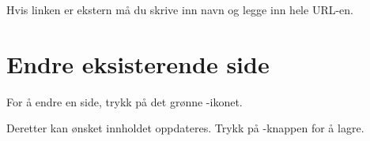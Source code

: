 Hvis linken er ekstern må du skrive inn navn og legge inn hele URL-en.
 \begin{figure}[H]
    \centering
    \label{fig:cms-external-link}
\end{figure}

\section{Endre eksisterende side}
For å endre en side, trykk på det grønne -ikonet. 

\begin{figure}[H]
    \centering
    \label{fig:cms-edit}
\end{figure}

Deretter kan ønsket innholdet oppdateres. Trykk på -knappen for å lagre.

